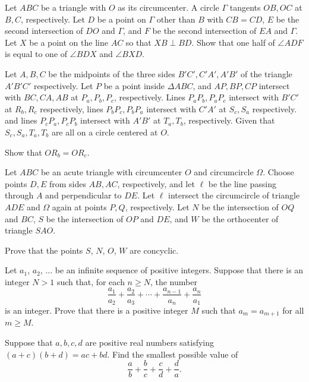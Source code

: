 \documentclass[11pt]{scrartcl}
\begin{document}
\begin{problem}[537574018594693]
Let $ABC$ be a triangle with $O$ as its circumcenter. A circle $\Gamma$ tangents $OB, OC$ at $B, C$, respectively. Let $D$ be a point on $\Gamma$ other than $B$ with $CB=CD$, $E$ be the second intersection of $DO$ and $\Gamma$, and $F$ be the second intersection of $EA$ and $\Gamma$. Let $X$ be a point on the line $AC$ so that $XB\perp BD$. Show that one half of $\angle ADF$ is equal to one of $\angle BDX$ and $\angle BXD$.
\end{problem}
\begin{problem}[5261846980754565299]
	Let $A,B,C$ be the midpoints of the three sides $B'C', C'A', A'B'$ of the triangle $A'B'C'$ respectively. Let $P$ be a point inside $\Delta ABC$, and $AP,BP,CP$ intersect with $BC, CA, AB$ at $P_a,P_b,P_c$, respectively. Lines $P_aP_b, P_aP_c$ intersect with $B'C'$ at $R_b, R_c$ respectively, lines $P_bP_c, P_bP_a$ intersect with $C'A'$ at $S_c, S_a$ respectively. and lines $P_cP_a, P_cP_b$ intersect with $A'B'$ at $T_a, T_b$, respectively. Given that $S_c,S_a, T_a, T_b$ are all on a circle centered at $O$.

Show that $OR_b=OR_c$.
\end{problem}
\begin{problem}[5066939379306191291]
Let $ABC$ be an acute triangle with circumcenter $O$ and circumcircle $\Omega$. Choose points $D, E$ from sides $AB, AC$, respectively, and let $\ell$ be the line passing through $A$ and perpendicular to $DE$. Let $\ell$ intersect the circumcircle of triangle $ADE$ and $\Omega$ again at points $P, Q$, respectively. Let $N$ be the intersection of $OQ$ and $BC$, $S$ be the intersection of $OP$ and $DE$, and $W$ be the orthocenter of triangle $SAO$.

Prove that the points $S$, $N$, $O$, $W$ are concyclic.
\end{problem}
\begin{problem}[402654566950359]
Let $a_1$, $a_2$, $\ldots$ be an infinite sequence of positive integers. Suppose that there is an integer $N > 1$ such that, for each $n \geq N$, the number
$$\frac{a_1}{a_2} + \frac{a_2}{a_3} + \cdots + \frac{a_{n-1}}{a_n} + \frac{a_n}{a_1}$$is an integer. Prove that there is a positive integer $M$ such that $a_m = a_{m+1}$ for all $m \geq M$.
\end{problem}
\begin{problem}[132497611943266]
Suppose that $a,b,c,d$ are positive real numbers satisfying $(a+c)(b+d)=ac+bd$. Find the smallest possible value of
$$\frac{a}{b}+\frac{b}{c}+\frac{c}{d}+\frac{d}{a}.$$
\end{problem}
\end{document}
